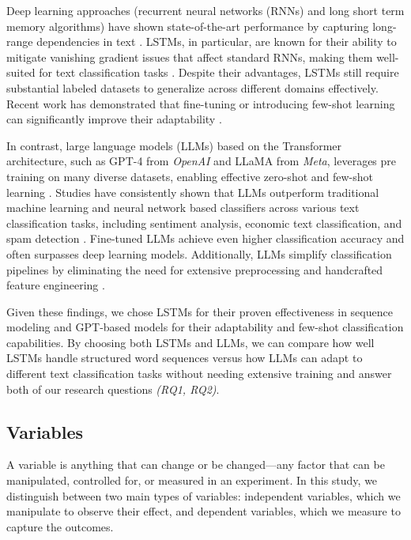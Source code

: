 Deep learning approaches (recurrent neural networks (RNNs) and long short term memory algorithms) have shown state-of-the-art performance by capturing long-range dependencies in text \cite{sutskever2014sequence}. LSTMs, in particular, are known for their ability to mitigate vanishing gradient issues that affect standard RNNs, making them well-suited for text classification tasks \cite{hochreiter1997long}. Despite their advantages, LSTMs still require substantial labeled datasets to generalize across different domains effectively. Recent work has demonstrated that fine-tuning or introducing few-shot learning can significantly improve their adaptability \cite{jamshidi2024effective}.

In contrast, large language models (LLMs) based on the Transformer architecture, such as GPT-4 from \textit{OpenAI} and LLaMA from \textit{Meta}, leverages pre training on many diverse datasets, enabling effective zero-shot and few-shot learning \cite{brown2020language, touvron2023llama}. Studies have consistently shown that LLMs outperform traditional machine learning and neural network based classifiers across various text classification tasks, including sentiment analysis, economic text classification, and spam detection \cite{moller2024parrot, betianu2024dallmi}. Fine-tuned LLMs achieve even higher classification accuracy and often surpasses deep learning models. Additionally, LLMs simplify classification pipelines by eliminating the need for extensive preprocessing and handcrafted feature engineering \cite{oh2024language}.

Given these findings, we chose LSTMs for their proven effectiveness in sequence modeling and GPT-based models for their adaptability and few-shot classification capabilities. By choosing both LSTMs and LLMs, we can compare how well LSTMs handle structured word sequences versus how LLMs can adapt to different text classification tasks without needing extensive training and answer both of our research questions \textit{(RQ1, RQ2)}.

\subsection{Variables}
A variable is anything that can change or be changed—any factor that can be manipulated, controlled for, or measured in an experiment. In this study, we distinguish between two main types of variables: independent variables, which we manipulate to observe their effect, and dependent variables, which we measure to capture the outcomes.


